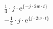 \correct
\[
\begin{split}
& \frac{1}{4} \cdot j \cdot \textrm{e}^{\{-j \cdot 2w \cdot t \}} \\
&-\frac{1}{4} \cdot j \cdot \textrm{e}^{\{ j \cdot 2w \cdot t \}} 
\end{split}
\]
